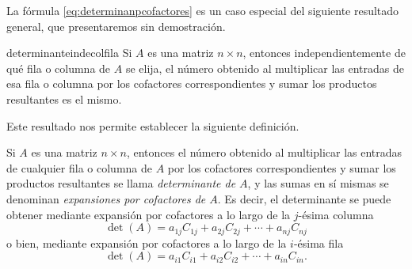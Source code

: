 La fórmula \eqref{eq:determinanpcofactores} es un caso especial del siguiente resultado general, que presentaremos sin demostración.

\begin{theorem}{}{determinanteindecolfila}
    Si $A$ es una matriz $n \times n$, entonces independientemente de qué fila o columna de $A$ se elija, el número obtenido al multiplicar las entradas de esa fila o columna por los cofactores correspondientes y sumar los productos resultantes es el mismo.
\end{theorem}

Este resultado nos permite establecer la siguiente definición.

\begin{definicion}{}{}
    Si $A$ es una matriz $n \times n$, entonces el número obtenido al multiplicar las entradas de cualquier fila o columna de $A$ por los cofactores correspondientes y sumar los productos resultantes se llama \emph{determinante de $A$}, y las sumas en sí mismas se denominan \emph{expansiones por cofactores de $A$}. Es decir, el determinante se puede obtener mediante expansión por cofactores a lo largo de la $j$-ésima columna
    \begin{equation}
        \det(A) = a_{1j} C_{1j} + a_{2j} C_{2j} + \cdots + a_{nj} C_{nj} \label{eq:determinantecofcolumna}
    \end{equation}
    o bien, mediante expansión por cofactores a lo largo de la $i$-ésima fila
    \begin{equation}
        \det(A) = a_{i1} C_{i1} + a_{i2} C_{i2} + \cdots + a_{in} C_{in}. \label{eq:determinantecoffila}
    \end{equation}
\end{definicion}

